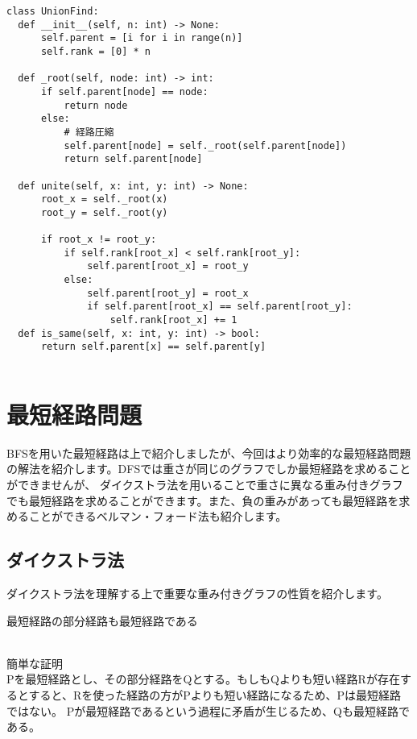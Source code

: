 \documentclass{jlreq}
\begin{document}
\begin{lstlisting}[caption=Union-Find木の実装, label=union_find, frame=TRBL, label={union_find}]
class UnionFind:
  def __init__(self, n: int) -> None:
      self.parent = [i for i in range(n)]
      self.rank = [0] * n
  
  def _root(self, node: int) -> int:
      if self.parent[node] == node:
          return node
      else:
          # 経路圧縮
          self.parent[node] = self._root(self.parent[node])
          return self.parent[node]
  
  def unite(self, x: int, y: int) -> None:
      root_x = self._root(x)
      root_y = self._root(y)
      
      if root_x != root_y:
          if self.rank[root_x] < self.rank[root_y]:
              self.parent[root_x] = root_y
          else:
              self.parent[root_y] = root_x
              if self.parent[root_x] == self.parent[root_y]:
                  self.rank[root_x] += 1
  def is_same(self, x: int, y: int) -> bool:
      return self.parent[x] == self.parent[y]


\end{lstlisting}


\newpage
\section{最短経路問題}
BFSを用いた最短経路は上で紹介しましたが、今回はより効率的な最短経路問題の解法を紹介します。DFSでは重さが同じのグラフでしか最短経路を求めることができませんが、
ダイクストラ法を用いることで重さに異なる重み付きグラフでも最短経路を求めることができます。また、負の重みがあっても最短経路を求めることができるベルマン・フォード法も紹介します。

\subsection{ダイクストラ法}
ダイクストラ法を理解する上で重要な重み付きグラフの性質を紹介します。

\begin{theorembox}[経路緩和性]
  最短経路の部分経路も最短経路である


  \dotfill \\
  簡単な証明 \\
  Pを最短経路とし、その部分経路をQとする。もしもQよりも短い経路Rが存在するとすると、Rを使った経路の方がPよりも短い経路になるため、Pは最短経路ではない。
  Pが最短経路であるという過程に矛盾が生じるため、Qも最短経路である。
\end{theorembox}
\end{document}
